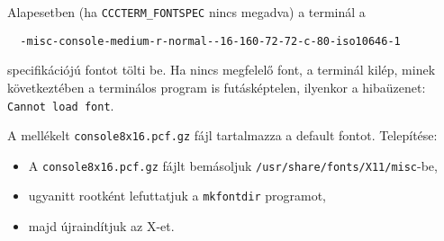 Alapesetben (ha \verb!CCCTERM_FONTSPEC! nincs megadva) a terminál a

\begin{verbatim}
  -misc-console-medium-r-normal--16-160-72-72-c-80-iso10646-1
\end{verbatim}

specifikációjú fontot tölti be. 
Ha nincs megfelelő font, a terminál kilép, minek következtében 
a terminálos program is futásképtelen, ilyenkor a hibaüzenet: \verb!Cannot load font!.

A mellékelt \verb!console8x16.pcf.gz! fájl tartalmazza a default fontot. Telepítése:
\begin{itemize}
\item A \verb!console8x16.pcf.gz! fájlt bemásoljuk \verb!/usr/share/fonts/X11/misc!-be,
\item ugyanitt rootként lefuttatjuk a \verb!mkfontdir! programot,
\item majd újraindítjuk az X-et.
\end{itemize}





